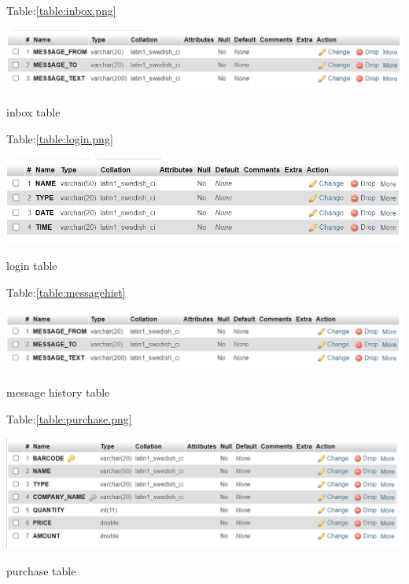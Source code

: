 \documentclass[12pt, letter paper]{report}
\begin{document}
\begin{center}
	Table:\ref{table:inbox.png}
	\begin{table}[h]
		\centering
		\includegraphics[width=1\textwidth]{inbox.png}
		\caption{inbox table}
		\label{table:inbox.png}
	\end{table}
\end{center}

\begin{center}
	Table:\ref{table:login.png}
	\begin{table}[h]
		\centering
		\includegraphics[width=1\textwidth]{login.png}
		\caption{login table}
		\label{table:login.png}
	\end{table}
\end{center}
\newpage
\begin{center}
	Table:\ref{table:messagehist}
	\begin{table}[h]
		\centering
		\includegraphics[width=1\textwidth]{messagehist.png}
		\caption{message history table}
		\label{table:messagehist}
	\end{table}
\end{center}

\begin{center}
	Table:\ref{table:purchase.png}
	\begin{table}[h]
		\centering
		\includegraphics[width=1\textwidth]{purchase.png}
		\caption{purchase table}
		\label{table:purchase.png}
	\end{table}
\end{center}
\end{document}
